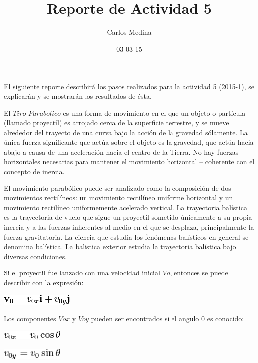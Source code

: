 \documentclass[12pt]{article}
\title{Reporte de Actividad 5}
\author{Carlos Medina}
\date{03-03-15}
\begin{document}
\maketitle


El siguiente reporte describirá los pasos realizados para la actividad 5 (2015-1), se explicarán y se mostrarán los resultados de ésta.




\hspace {0.5cm} El $Tiro$ $Parabolico$ es una forma de movimiento en el que un objeto o partícula (llamado proyectíl) es arrojado cerca de la superficie terrestre, y se mueve alrededor del trayecto de una curva bajo la acción de la gravedad sólamente. La única fuerza significante que actúa sobre el objeto es la gravedad, que actúa hacia abajo a causa de una aceleración hacia el centro de la Tierra. No hay fuerzas horizontales necesarias para mantener el movimiento horizontal – coherente con el concepto de inercia. 

El movimiento parabólico puede ser analizado como la composición de dos movimientos rectilíneos: un movimiento rectilíneo uniforme horizontal y un movimiento rectilíneo uniformemente acelerado vertical.
La trayectoria balística es la trayectoria de vuelo que sigue un proyectil sometido únicamente a su propia inercia y a las fuerzas inherentes al medio en el que se desplaza, principalmente la fuerza gravitatoria. La ciencia que estudia los fenómenos balísticos en general se denomina balística. La balistica exterior estudia la trayectoria balística bajo diversas condiciones.

Si el proyectil fue lanzado con una velocidad inicial $Vo$, entonces se puede describir con la expresión:

\begin{center}
	\includegraphics[width=3.5cm]{velin.png}\\
\end{center}

Los componentes $Vox$ y $Voy$ pueden ser encontrados si el angulo $0$ es conocido:

\begin{center}
	\includegraphics[width=3cm]{velx.png}\\
\end{center}
\begin{center}
	\includegraphics[width=3cm]{vely.png}\\
\end{center}
\end{document}
